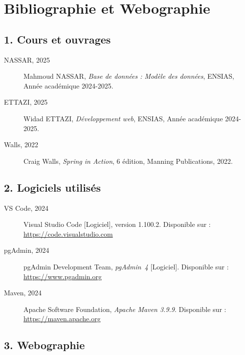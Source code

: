 \documentclass[12pt,a4paper]{report}
\begin{document}
\chapter*{Bibliographie et Webographie}
\thispagestyle{fancy}

\section*{1. Cours et ouvrages}

\begin{description}
    \item[NASSAR, 2025] Mahmoud NASSAR, \textit{Base de données : Modèle des données},
    ENSIAS, Année académique 2024-2025.

    \item[ETTAZI, 2025] Widad ETTAZI, \textit{Développement web}, ENSIAS,
    Année académique 2024-2025.

    \item[Walls, 2022] Craig Walls, \textit{Spring in Action}, 6\ieme{} édition,
    Manning Publications, 2022.
\end{description}

\section*{2. Logiciels utilisés}

\begin{description}
    \item[VS Code, 2024] Visual Studio Code [Logiciel], version 1.100.2.
    Disponible sur : \url{https://code.visualstudio.com}

    \item[pgAdmin, 2024] pgAdmin Development Team, \textit{pgAdmin~4} [Logiciel].
    Disponible sur : \url{https://www.pgadmin.org}

    \item[Maven, 2024] Apache Software Foundation, \textit{Apache Maven 3.9.9}.
    Disponible sur : \url{https://maven.apache.org}
\end{description}

\section*{3. Webographie}
\end{document}
